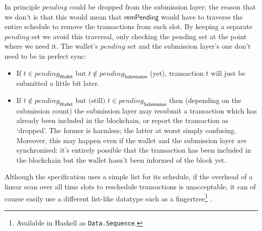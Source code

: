 \documentclass{article}
\theoremstyle{definition}{
  \newtheorem{lemma}{Lemma}[section] %
  \newtheorem{definition}[lemma]{Definition}
}
\theoremstyle{theorem}{
  \newtheorem{invariant}[lemma]{Invariant}
  \newtheorem{proofobligation}[lemma]{Proof Obligation}
}
\numberwithin{equation}{lemma}
\begin{document}
In principle $\mathit{pending}$ could be dropped from the submission layer; the
reason that we don't is that this would mean that $\mathsf{remPending}$ would
have to traverse the entire schedule to remove the transactions from each slot.
By keeping a separate $\mathit{pending}$ set we avoid this traversal, only
checking the pending set at the point where we need it. The wallet's
$\mathit{pending}$ set and the submission layer's one don't need to be in
perfect sync:
%
\begin{itemize}
\item If
\begin{math}
t \in    \mathit{pending}_\mathsf{Wallet} \text{ but }
t \notin \mathit{pending}_\mathsf{Submission}
\end{math}
(yet), transaction $t$ will just be submitted a little bit later.

\item If
\begin{math}
t \notin \mathit{pending}_\mathsf{Wallet} \text{ but (still) }
t \in    \mathit{pending}_\mathsf{Submission}
\end{math}
then (depending on the submission count) the submission layer may resubmit a
transaction which has already been included in the blockchain, or report the
transaction as `dropped'. The former is harmless; the latter at worst simply
confusing. Moreover,  this may happen even if the wallet and the submission
layer \emph{are} synchronised: it's entirely possible that the transaction has
been included in the blockchain but the wallet hasn't been informed of the block
yet.
\end{itemize}

Although the specification uses a simple list for its schedule, if the overhead
of a linear scan over all time slots to reschedule transactions is unacceptable,
it can of course easily use a different list-like datatype such as a
fingertree\footnote{Available in Haskell as \texttt{Data.Sequence}.}
\citep{hinze_paterson_2006}.
\end{document}
